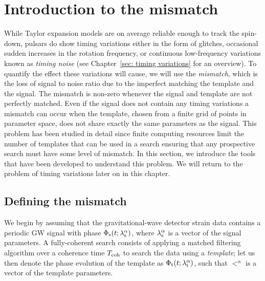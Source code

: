 \documentclass[../full_thesis/full_thesis.tex]{subfiles}
\begin{document}
\section{Introduction to the mismatch}
\label{sec: introduction to the mismatch}
While Taylor expansion models are on average reliable enough to track the
spin-down, pulsars do show timing variations either in the form of glitches,
occasional sudden increases in the rotation frequency, or continuous
low-frequency variations known as \emph{timing noise} (see Chapter~\ref{sec:
timing variations} for an overview). To quantify the effect these variations
will cause, we will use the \emph{mismatch}, which is the loss of signal to
noise ratio due to the imperfect matching the template and the signal. The
mismatch is non-zero whenever the signal and template are not perfectly
matched. Even if the signal does not contain any timing variations a mismatch
can occur when the template, chosen from a finite grid of points in parameter
space, does not share exactly the same parameters as the signal. This problem
has been studied in detail since finite computing resources limit the number of
templates that can be used in a search ensuring that any prospective search
must have some level of mismatch. In this section, we introduce the tools
that have been developed to understand this problem. We will return to the
problem of timing variations later on in this chapter.

\subsection{Defining the mismatch}

We begin by assuming that the gravitational-wave detector strain data contains
a periodic GW signal with phase $\Phi_{\textrm{s}}(t; {\lambda}_\textrm{s}^{\alpha})$, where ${\lambda}_\textrm{s}^{\alpha}$
is a vector of the signal parameters. A fully-coherent search consists of
applying a matched filtering algorithm over a coherence time $T_{\mathrm{coh}}$ to search
the data using a \emph{template}; let us then denote the phase evolution of the
template as $\Phi_{\textrm{t}}(t; {\lambda}_\textrm{t}^{\alpha})$, such that $\lt^{\alpha}$ is a vector of
the template parameters.
\end{document}
